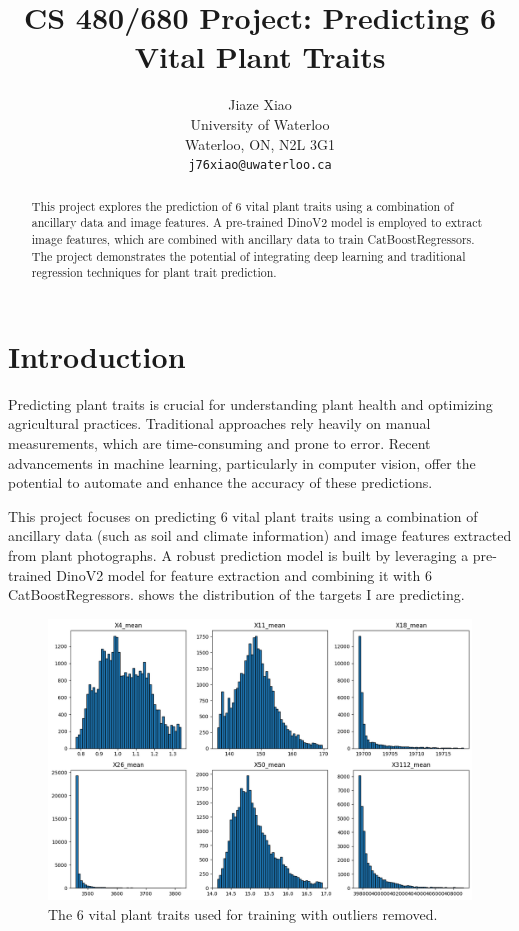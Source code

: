 \documentclass{article}
\title{CS 480/680 Project: Predicting 6 Vital Plant Traits}
\author{
	Jiaze Xiao \\
	University of Waterloo\\
	Waterloo, ON, N2L 3G1 \\
	\texttt{j76xiao@uwaterloo.ca}
}
\begin{document}
\maketitle

\begin{abstract}
	This project explores the prediction of 6 vital plant traits using a combination of ancillary data and image features. A pre-trained DinoV2 model is employed to extract image features, which are combined with ancillary data to train CatBoostRegressors. The project demonstrates the potential of integrating deep learning and traditional regression techniques for plant trait prediction.
\end{abstract}

\section{Introduction}
Predicting plant traits is crucial for understanding plant health and optimizing agricultural practices. Traditional approaches rely heavily on manual measurements, which are time-consuming and prone to error. Recent advancements in machine learning, particularly in computer vision, offer the potential to automate and enhance the accuracy of these predictions.

This project focuses on predicting 6 vital plant traits using a combination of ancillary data (such as soil and climate information) and image features extracted from plant photographs. A robust prediction model is built by leveraging a pre-trained DinoV2 model for feature extraction and combining it with 6 CatBoostRegressors.  shows the distribution of the targets I are predicting.

\begin{figure}[h]
	\centering
	\includegraphics[scale=0.4]{targets.png}
	\caption{The 6 vital plant traits used for training with outliers removed.}
	\label{fig:targets}
\end{figure}
\end{document}
